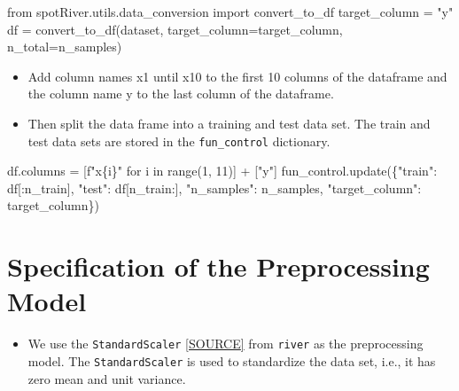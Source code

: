 \documentclass[
  letterpaper,
  DIV=11,
  numbers=noendperiod]{scrreprt}
\newenvironment{Shaded}{\begin{snugshade}}{\end{snugshade}}
\newcommand{\BuiltInTok}[1]{\textcolor[rgb]{0.00,0.23,0.31}{#1}}
\newcommand{\ControlFlowTok}[1]{\textcolor[rgb]{0.00,0.23,0.31}{#1}}
\newcommand{\DecValTok}[1]{\textcolor[rgb]{0.68,0.00,0.00}{#1}}
\newcommand{\ImportTok}[1]{\textcolor[rgb]{0.00,0.46,0.62}{#1}}
\newcommand{\KeywordTok}[1]{\textcolor[rgb]{0.00,0.23,0.31}{#1}}
\newcommand{\NormalTok}[1]{\textcolor[rgb]{0.00,0.23,0.31}{#1}}
\newcommand{\OperatorTok}[1]{\textcolor[rgb]{0.37,0.37,0.37}{#1}}
\newcommand{\SpecialCharTok}[1]{\textcolor[rgb]{0.37,0.37,0.37}{#1}}
\newcommand{\SpecialStringTok}[1]{\textcolor[rgb]{0.13,0.47,0.30}{#1}}
\newcommand{\StringTok}[1]{\textcolor[rgb]{0.13,0.47,0.30}{#1}}
\providecommand{\tightlist}{%
  \setlength{\itemsep}{0pt}\setlength{\parskip}{0pt}}\usepackage{longtable,booktabs,array}
\begin{document}
\begin{Shaded}
\begin{Highlighting}[]
\ImportTok{from}\NormalTok{ spotRiver.utils.data\_conversion }\ImportTok{import}\NormalTok{ convert\_to\_df}
\NormalTok{target\_column }\OperatorTok{=} \StringTok{"y"}
\NormalTok{df }\OperatorTok{=}\NormalTok{ convert\_to\_df(dataset, target\_column}\OperatorTok{=}\NormalTok{target\_column, n\_total}\OperatorTok{=}\NormalTok{n\_samples)}
\end{Highlighting}
\end{Shaded}

\begin{itemize}
\tightlist
\item
  Add column names x1 until x10 to the first 10 columns of the dataframe
  and the column name y to the last column of the dataframe.
\item
  Then split the data frame into a training and test data set. The train
  and test data sets are stored in the \texttt{fun\_control} dictionary.
\end{itemize}

\begin{Shaded}
\begin{Highlighting}[]
\NormalTok{df.columns }\OperatorTok{=}\NormalTok{ [}\SpecialStringTok{f"x}\SpecialCharTok{\{}\NormalTok{i}\SpecialCharTok{\}}\SpecialStringTok{"} \ControlFlowTok{for}\NormalTok{ i }\KeywordTok{in} \BuiltInTok{range}\NormalTok{(}\DecValTok{1}\NormalTok{, }\DecValTok{11}\NormalTok{)] }\OperatorTok{+}\NormalTok{ [}\StringTok{"y"}\NormalTok{]}
\NormalTok{fun\_control.update(\{}\StringTok{"train"}\NormalTok{:  df[:n\_train],}
                    \StringTok{"test"}\NormalTok{:  df[n\_train:],}
                    \StringTok{"n\_samples"}\NormalTok{: n\_samples,}
                    \StringTok{"target\_column"}\NormalTok{: target\_column\})}
\end{Highlighting}
\end{Shaded}

\hypertarget{specification-of-the-preprocessing-model}{%
\section{Specification of the Preprocessing
Model}\label{specification-of-the-preprocessing-model}}

\begin{itemize}
\tightlist
\item
  We use the \texttt{StandardScaler}
  \href{https://riverml.xyz/dev/api/preprocessing/StandardScaler/}{{[}SOURCE{]}}
  from \texttt{river} as the preprocessing model. The
  \texttt{StandardScaler} is used to standardize the data set, i.e., it
  has zero mean and unit variance.
\end{itemize}
\end{document}
